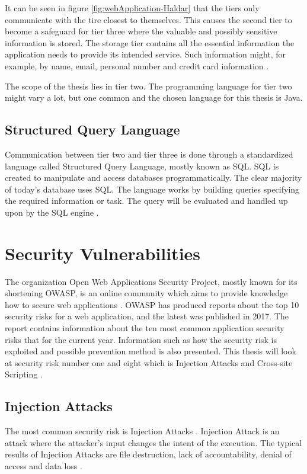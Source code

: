 It can be seen in figure \ref{fig:webApplication-Haldar} that the tiers only communicate with the tire closest to themselves. This causes the second tier to become a safeguard for tier three where the valuable and possibly sensitive information is stored. The storage tier contains all the essential information the application needs to provide its intended service. Such information might, for example, by name, email, personal number and credit card information \parencite{JustinClarke-Salt2009SIAa}.

The scope of the thesis lies in tier two. The programming language for tier two might vary a lot, but one common and the chosen language for this thesis is Java.


\subsection{Structured Query Language}
Communication between tier two and tier three is done through a standardized language called Structured Query Language, mostly known as SQL. SQL is created to manipulate and access databases programmatically. The clear majority of today's database uses SQL. The language works by building queries specifying the required information or task. The query will be evaluated and handled up upon by the SQL engine \parencite{DarieCristian2003TPGt}.



\section{Security Vulnerabilities}
\label{SecurityVulnerabilities}
The organization Open Web Applications Security Project, mostly known for its shortening OWASP, is an online community which aims to provide knowledge how to secure web applications \parencite{OpenWebApplicationSecurityProject}. OWASP has produced reports about the top 10 security risks for a web application, and the latest was published in 2017. The report contains information about the ten most common application security risks that for the current year. Information such as how the security risk is exploited and possible prevention method is also presented. This thesis will look at security risk number one and eight which is Injection Attacks and Cross-site Scripting \parencite{OWASP2017}.



\subsection{Injection Attacks}
The most common security risk is Injection Attacks \parencite{OWASP2017}. Injection Attack is an attack where the attacker's input changes the intent of the execution. The typical results of Injection Attacks are file destruction, lack of accountability, denial of access and data loss \parencite{Secure_Web}.

